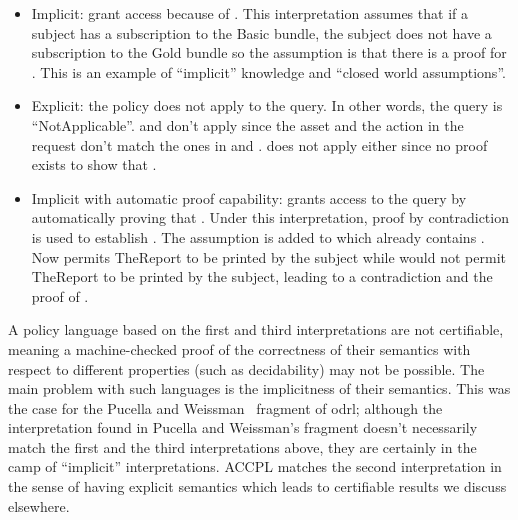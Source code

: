 \begin{itemize}
\item Implicit: grant access because of . This interpretation assumes that if a subject has a subscription to the Basic bundle, the subject does not have a subscription to the Gold bundle so the assumption is that there is a proof for . This is an example of ``implicit'' knowledge and ``closed world assumptions''.

\item Explicit: the policy does not apply to the query. In other words, the query is ``NotApplicable''.  and  don't apply since the asset and the action in the request don't match the ones in  and .  does not apply either since no proof exists to show that . 

\item Implicit with automatic proof capability: grants access to the query by automatically proving that . Under this interpretation, proof by contradiction is used to establish . The assumption  is added to  which already contains . Now  permits TheReport to be printed by the subject while  would not permit TheReport to be printed by the subject, leading to a contradiction and the proof of .
\end{itemize}

A policy language based on the first and third interpretations are not certifiable, meaning a machine-checked proof of the correctness of their semantics with respect to different properties (such as decidability) may not be possible. The main problem with such languages is the implicitness of their semantics. This was the case for the Pucella and Weissman~\cite{pucella2006} fragment of \ac{odrl}; although the interpretation found in Pucella and Weissman's fragment doesn't necessarily match the first and the third interpretations above, they are certainly in the camp of ``implicit'' interpretations. \ac{ACCPL} matches the second interpretation in the sense of having explicit semantics which leads to certifiable results we discuss elsewhere. 





